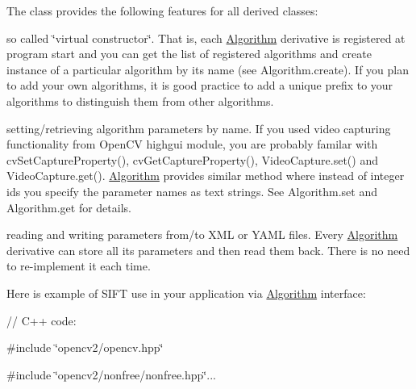 The class provides the following features for all derived classes\+:


\begin{DoxyItemize}
\item so called \char`\"{}virtual constructor\char`\"{}. That is, each \mbox{\hyperlink{classorg_1_1opencv_1_1core_1_1_algorithm}{Algorithm}} derivative is registered at program start and you can get the list of registered algorithms and create instance of a particular algorithm by its name (see {\ttfamily Algorithm.\+create}). If you plan to add your own algorithms, it is good practice to add a unique prefix to your algorithms to distinguish them from other algorithms. 
\item setting/retrieving algorithm parameters by name. If you used video capturing functionality from Open\+CV highgui module, you are probably familar with {\ttfamily cv\+Set\+Capture\+Property()}, {\ttfamily cv\+Get\+Capture\+Property()}, {\ttfamily Video\+Capture.\+set()} and {\ttfamily Video\+Capture.\+get()}. {\ttfamily \mbox{\hyperlink{classorg_1_1opencv_1_1core_1_1_algorithm}{Algorithm}}} provides similar method where instead of integer id\textquotesingle{}s you specify the parameter names as text strings. See {\ttfamily Algorithm.\+set} and {\ttfamily Algorithm.\+get} for details. 
\item reading and writing parameters from/to X\+ML or Y\+A\+ML files. Every \mbox{\hyperlink{classorg_1_1opencv_1_1core_1_1_algorithm}{Algorithm}} derivative can store all its parameters and then read them back. There is no need to re-\/implement it each time. 
\end{DoxyItemize}

Here is example of S\+I\+FT use in your application via \mbox{\hyperlink{classorg_1_1opencv_1_1core_1_1_algorithm}{Algorithm}} interface\+: {\ttfamily }

{\ttfamily }

{\ttfamily }

{\ttfamily // C++ code\+:}

{\ttfamily }

{\ttfamily }

{\ttfamily \#include \char`\"{}opencv2/opencv.\+hpp\char`\"{}}

{\ttfamily }

{\ttfamily }

{\ttfamily \#include \char`\"{}opencv2/nonfree/nonfree.\+hpp\char`\"{}...}

{\ttfamily }

{\ttfamily }

